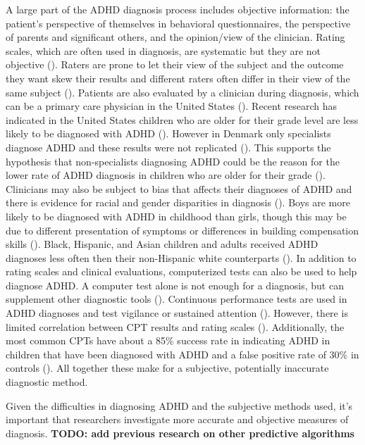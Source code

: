 \documentclass[,article,submit,moreauthors,pdftex]{mdpi}
\begin{document}
A large part of the ADHD diagnosis process includes objective
information: the patient's perspective of themselves in behavioral
questionnaires, the perspective of parents and significant others, and
the opinion/view of the clinician. Rating scales, which are often used
in diagnosis, are systematic but they are not objective
(\citet{gualtieri_adhd_2005}). Raters are prone to let their view of the
subject and the outcome they want skew their results and different
raters often differ in their view of the same subject
(\citet{gualtieri_adhd_2005}). Patients are also evaluated by a
clinician during diagnosis, which can be a primary care physician in the
United States (\citet{contributors_diagnosing_nodate}). Recent research
has indicated in the United States children who are older for their
grade level are less likely to be diagnosed with ADHD
(\citet{dalsgaard_relative_2012}). However in Denmark only specialists
diagnose ADHD and these results were not replicated
(\citet{dalsgaard_relative_2012}). This supports the hypothesis that
non-specialists diagnosing ADHD could be the reason for the lower rate
of ADHD diagnosis in children who are older for their grade
(\citet{dalsgaard_relative_2012}). Clinicians may also be subject to
bias that affects their diagnoses of ADHD and there is evidence for
racial and gender disparities in diagnosis (\citet{noauthor_what_2022}).
Boys are more likely to be diagnosed with ADHD in childhood than girls,
though this may be due to different presentation of symptoms or
differences in building compensation skills
(\citet{noauthor_what_2022}). Black, Hispanic, and Asian children and
adults received ADHD diagnoses less often then their non-Hispanic white
counterparts (\citet{noauthor_what_2022}). In addition to rating scales
and clinical evaluations, computerized tests can also be used to help
diagnose ADHD. A computer test alone is not enough for a diagnosis, but
can supplement other diagnostic tools (\citet{gualtieri_adhd_2005}).
Continuous performance tests are used in ADHD diagnoses and test
vigilance or sustained attention (\citet{gualtieri_adhd_2005}). However,
there is limited correlation between CPT results and rating scales
(\citet{gualtieri_adhd_2005}). Additionally, the most common CPTs have
about a 85\% success rate in indicating ADHD in children that have been
diagnosed with ADHD and a false positive rate of 30\% in controls
(\citet{gualtieri_adhd_2005}). All together these make for a subjective,
potentially inaccurate diagnostic method.

Given the difficulties in diagnosing ADHD and the subjective methods
used, it's important that researchers investigate more accurate and
objective measures of diagnosis. \textbf{TODO: add previous research on
other predictive algorithms}
\end{document}
